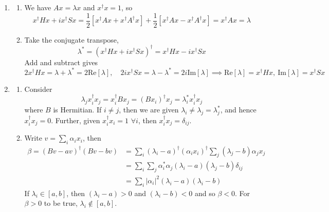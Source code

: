 \documentclass[a4paper]{article}
\begin{document}
\begin{ans}\leavevmode
\begin{enumerate}[label=(\roman*)]
\item 
\begin{enumerate}[label=(\alph*)]
\item We have $Ax=\lambda x$ and $x^\dag x=1$, so
$$x^\dag Hx+ix^\dag Sx=\frac{1}{2}[x^\dag Ax+x^\dag A^\dag x]+\frac{1}{2}[x^\dag Ax-x^\dag A^\dag x]=x^\dag Ax=\lambda$$
\item Take the conjugate transpose,
$$\lambda^*=(x^\dag Hx+ix^\dag Sx)^\dag=x^\dag Hx-ix^\dag Sx$$ Add and subtract gives 
$$2x^\dag Hx=\lambda+\lambda^*=2\text{Re}[\lambda],\quad 2ix^\dag Sx=\lambda-\lambda^*=2i\text{Im}[\lambda]\implies \text{Re}[\lambda]=x^\dag Hx,~\text{Im}[\lambda]=x^\dag Sx$$
\end{enumerate}
\item
\begin{enumerate}[label=(\alph*)]
\item Consider
$$\lambda_jx_i^\dag x_j=x_i^\dag Bx_j=(Bx_i)^\dag x_j=\lambda_i^* x_i^\dag x_j$$
where $B$ is Hermitian. If $i\neq j$, then we are given $\lambda_i\neq\lambda_j=\lambda_j^*$, and hence $x_i^\dag x_j=0$. Further, given $x_i^\dag x_i=1$ $\forall i$, then $x_i^\dag x_j=\delta_{ij}$.
\item Write $v=\sum_i\alpha_ix_i$, then 
\begin{align}
\beta=(Bv-av)^\dag(Bv-bv)&=\sum_i(\lambda_i-a)^\dag(\alpha_ix_i)^\dag\sum_j(\lambda_j-b)\alpha_jx_j\nonumber\\&=\sum_i\sum_j\alpha_i^*\alpha_j(\lambda_i-a)(\lambda_j-b)\delta_{ij}\nonumber\\&=\sum_i|\alpha_i|^2(\lambda_i-a)(\lambda_i-b)\nonumber
\end{align}
If $\lambda_i\in[a,b]$, then $(\lambda_i-a)>0$ and $(\lambda_i-b)<0$ and so $\beta<0$. For $\beta>0$ to be true, $\lambda_i\notin[a,b]$.
\end{enumerate}
\end{enumerate}
\end{ans}
\newpage
\end{document}
